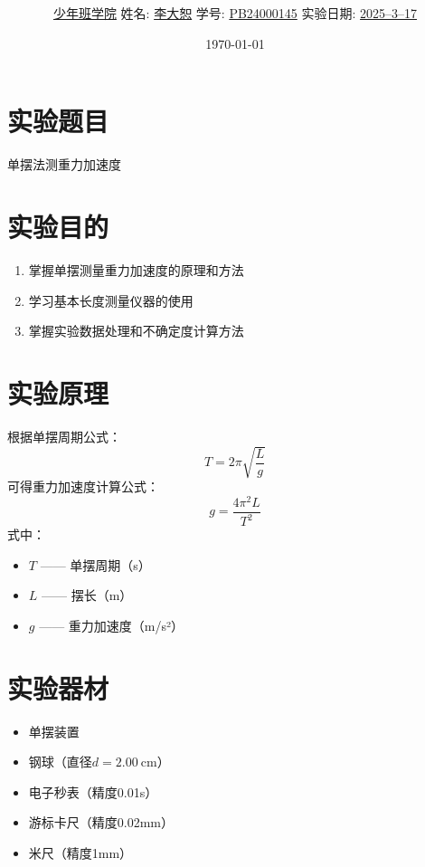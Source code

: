 \documentclass[12pt,a4paper]{article}
\title{\Huge{\textbf{\uuline{实\ 验\ 报\ 告}}}}
\author{\uline{少年班学院} \quad 姓名: \uline{李大恕} \quad 学号: \uline{PB24000145} \quad 实验日期: \uline{2025--3--17}}
\date{\today}
\begin{document}
\maketitle

\section{实验题目}
	单摆法测重力加速度

\section{实验目的}
    \begin{enumerate}
        \item 掌握单摆测量重力加速度的原理和方法
        \item 学习基本长度测量仪器的使用
        \item 掌握实验数据处理和不确定度计算方法
    \end{enumerate}

\section{实验原理}
    根据单摆周期公式：
    \begin{equation}
        T = 2\pi \sqrt{\frac{L}{g}}
    \end{equation}
    可得重力加速度计算公式：
    \begin{equation}
        g = \frac{4\pi^2 L}{T^2}
    \end{equation}
    式中：
    \begin{itemize}
        \item $T$ —— 单摆周期（s）
        \item $L$ —— 摆长（m）
        \item $g$ —— 重力加速度（m/s²）
    \end{itemize}

\section{实验器材}
    \begin{itemize}
        \item 单摆装置
        \item 钢球（直径$d=2.00\ \mathrm{cm}$）
        \item 电子秒表（精度0.01s）
        \item 游标卡尺（精度0.02mm）
        \item 米尺（精度1mm）
    \end{itemize}
\end{document}
